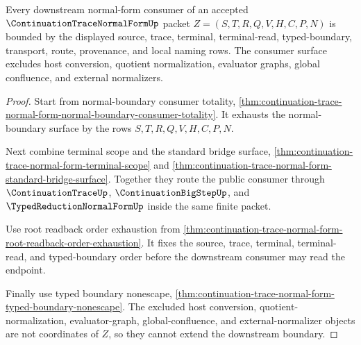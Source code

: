 \begin{theorem}
\label{thm:continuation-trace-normal-form-downstream-normalform-consumer-boundary}
Every downstream normal-form consumer of an accepted $\ContinuationTraceNormalFormUp$ packet $Z=(S,T,R,Q,V,H,C,P,N)$ is bounded by the displayed source, trace, terminal, terminal-read, typed-boundary, transport, route, provenance, and local naming rows. The consumer surface excludes host conversion, quotient normalization, evaluator graphs, global confluence, and external normalizers.
\end{theorem}
\begin{proof}
Start from normal-boundary consumer totality, \autoref{thm:continuation-trace-normal-form-normal-boundary-consumer-totality}. It exhausts the normal-boundary surface by the rows $S,T,R,Q,V,H,C,P,N$.

Next combine terminal scope and the standard bridge surface, \autoref{thm:continuation-trace-normal-form-terminal-scope} and \autoref{thm:continuation-trace-normal-form-standard-bridge-surface}. Together they route the public consumer through $\ContinuationTraceUp$, $\ContinuationBigStepUp$, and $\TypedReductionNormalFormUp$ inside the same finite packet.

Use root readback order exhaustion from \autoref{thm:continuation-trace-normal-form-root-readback-order-exhaustion}. It fixes the source, trace, terminal, terminal-read, and typed-boundary order before the downstream consumer may read the endpoint.

Finally use typed boundary nonescape, \autoref{thm:continuation-trace-normal-form-typed-boundary-nonescape}. The excluded host conversion, quotient-normalization, evaluator-graph, global-confluence, and external-normalizer objects are not coordinates of $Z$, so they cannot extend the downstream boundary.
\end{proof}

